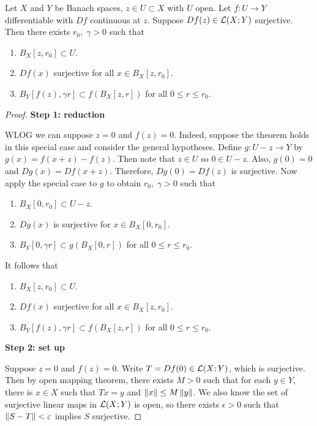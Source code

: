 \documentclass[a4paper]{article}
\begin{document}
\begin{thm}
  Let $X$ and $Y$ be Banach spaces, $z \in U \subset X$ with
  $U$ open. Let $f: U \to Y$ differentiable with
  $Df$ continuous at $z$. Suppose $Df(z) \in \mathcal{L}(X; Y)$
  surjective. Then there exists $r_0, \; \gamma > 0$ such that
  \begin{enumerate}
    \item $B_X[z, r_0] \subset U$.
    \item $Df(x)$ surjective for all $x \in B_X[z, r_0]$.
    \item $B_Y[f(z), \gamma r] \subset f(B_X[z, r])$ for all
          $0 \leq r \leq r_0$.
  \end{enumerate}
\end{thm}

\begin{proof}
  \textbf{Step 1: reduction}

  WLOG we can suppose $z = 0$ and $f(z) = 0$. Indeed, suppose the theorem
  holds in this special case and consider the general hypotheses. Define
  $g : U - z \to Y$ by $g(x) = f(x + z) - f(z)$. Then note that $z \in U$
  so $0 \in U - z$. Also, $g(0) = 0$ and $Dg(x) = Df(x + z)$. Therefore,
  $Dg(0) = Df(z)$ is surjective. Now apply the special case to $g$ to
  obtain $r_0, \; \gamma > 0$ such that
  \begin{enumerate}
    \item $B_X [0, r_0] \subset U - z$.
    \item $Dg(x)$ is surjective for $x \in B_X [0, r_0]$.
    \item $B_Y [0, \gamma r] \subset g(B_X [0, r])$
          for all $0 \leq r \leq r_0$.
  \end{enumerate}
  It follows that
  \begin{enumerate}
    \item $B_X[z, r_0] \subset U$.
    \item $Df(x)$ surjective for all $x \in B_X[z, r_0]$.
    \item $B_Y[f(z), \gamma r] \subset f(B_X[z, r])$ for all
          $0 \leq r \leq r_0$.
  \end{enumerate}

  \textbf{Step 2: set up}

  Suppose $z = 0$ and $f(z) = 0$. Write $T = Df(0) \in \mathcal{L}(X; Y)$, which is
  surjective. Then by open mapping theorem, there exists $M > 0$ such that
  for each $y \in Y$, there is $x \in X$ such that $T x = y$ and $\left\lVert x\right\rVert
  \leq M \left\lVert y\right\rVert$. We also know the set of surjective linear maps in
  $\mathcal{L}(X; Y)$ is open, so there exists $\epsilon > 0$ such that $\left\lVert S -
  T\right\rVert < \varepsilon$ implies $S$ surjective.


\end{proof}
\end{document}
